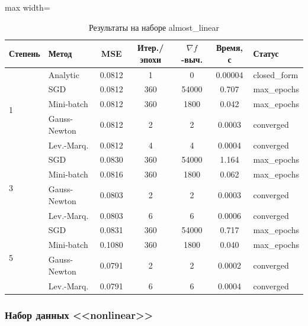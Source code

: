 \documentclass[12pt]{article}
\begin{document}
\begin{table}[H]
\centering
\caption{Результаты на наборе almost\_linear}
\begin{adjustbox}{max width=\textwidth}
\begin{tabular}{llccccl}
\toprule
\textbf{Степень} & \textbf{Метод} & \textbf{MSE} & \textbf{Итер./эпохи} & \textbf{$\nabla f$-выч.} & \textbf{Время, с} & \textbf{Статус} \\
\midrule
\multirow{5}{*}{1}
 & Analytic & 0.0812 & 1 & 0 & 0.00004 & closed\_form \\
 & SGD & 0.0812 & 360 & 54000 & 0.707 & max\_epochs \\
 & Mini-batch & 0.0812 & 360 & 1800 & 0.042 & max\_epochs \\
 & Gauss-Newton & 0.0812 & 2 & 2 & 0.0003 & converged \\
 & Lev.-Marq. & 0.0812 & 4 & 4 & 0.0004 & converged \\
\midrule
\multirow{4}{*}{3}
 & SGD & 0.0830 & 360 & 54000 & 1.164 & max\_epochs \\
 & Mini-batch & 0.0816 & 360 & 1800 & 0.062 & max\_epochs \\
 & Gauss-Newton & 0.0803 & 2 & 2 & 0.0003 & converged \\
 & Lev.-Marq. & 0.0803 & 6 & 6 & 0.0006 & converged \\
\midrule
\multirow{4}{*}{5}
 & SGD & 0.0831 & 360 & 54000 & 0.717 & max\_epochs \\
 & Mini-batch & 0.1080 & 360 & 1800 & 0.040 & max\_epochs \\
 & Gauss-Newton & 0.0791 & 2 & 2 & 0.0002 & converged \\
 & Lev.-Marq. & 0.0791 & 6 & 6 & 0.0004 & converged \\
\bottomrule
\end{tabular}
\end{adjustbox}
\end{table}

\subsubsection{Набор данных <<nonlinear>>}
\end{document}
